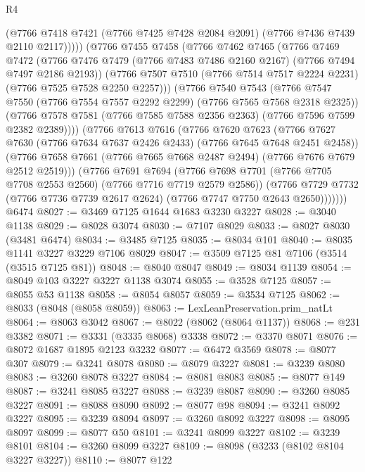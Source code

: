 \begin{lexlean}{R4}
\begin{coremodule}
              (@7766 @7418 @7421 (@7766 @7425 @7428 @2084 @2091) (@7766 @7436 @7439 @2110 @2117)))))
        (@7766
          @7455
          @7458
          (@7766
            @7462
            @7465
            (@7766
              @7469
              @7472
              (@7766 @7476 @7479 (@7766 @7483 @7486 @2160 @2167) (@7766 @7494 @7497 @2186 @2193))
              (@7766 @7507 @7510 (@7766 @7514 @7517 @2224 @2231) (@7766 @7525 @7528 @2250 @2257)))
            (@7766
              @7540
              @7543
              (@7766 @7547 @7550 (@7766 @7554 @7557 @2292 @2299) (@7766 @7565 @7568 @2318 @2325))
              (@7766 @7578 @7581 (@7766 @7585 @7588 @2356 @2363) (@7766 @7596 @7599 @2382 @2389))))
          (@7766
            @7613
            @7616
            (@7766
              @7620
              @7623
              (@7766 @7627 @7630 (@7766 @7634 @7637 @2426 @2433) (@7766 @7645 @7648 @2451 @2458))
              (@7766 @7658 @7661 (@7766 @7665 @7668 @2487 @2494) (@7766 @7676 @7679 @2512 @2519)))
            (@7766
              @7691
              @7694
              (@7766 @7698 @7701 (@7766 @7705 @7708 @2553 @2560) (@7766 @7716 @7719 @2579 @2586))
              (@7766
                @7729
                @7732
                (@7766 @7736 @7739 @2617 @2624)
                (@7766 @7747 @7750 @2643 @2650)))))))
    @6474
@8027 := @3469 @7125 @1644 @1683 @3230 @3227
@8028 := @3040 @1138
@8029 := @8028 @3074
@8030 := @7107 @8029
@8033 := @8027 @8030 (@3481 @6474)
@8034 := @3485 @7125
@8035 := @8034 @101
@8040 := @8035 @1141 @3227 @3229 @7106 @8029
@8047 := @3509 @7125 @81 @7106 (@3514 (@3515 @7125 @81))
@8048 := @8040 @8047
@8049 := @8034 @1139
@8054 := @8049 @103 @3227 @3227 @1138 @3074
@8055 := @3528 @7125
@8057 := @8055 @53 @1138
@8058 := @8054 @8057
@8059 := @3534 @7125
@8062 := @8033 (@8048 (@8058 @8059))
@8063 := LexLeanPreservation.prim_natLt
@8064 := @8063 @3042
@8067 := @8022 (@8062 (@8064 @1137))
@8068 := @231 @3382
@8071 := @3331 (@3335 @8068) @3338
@8072 := @3370 @8071
@8076 := @8072 @1687 @1895 @2123 @3232
@8077 := @6472 @3569
@8078 := @8077 @307
@8079 := @3241 @8078
@8080 := @8079 @3227
@8081 := @3239 @8080
@8083 := @3260 @8078 @3227
@8084 := @8081 @8083
@8085 := @8077 @149
@8087 := @3241 @8085 @3227
@8088 := @3239 @8087
@8090 := @3260 @8085 @3227
@8091 := @8088 @8090
@8092 := @8077 @98
@8094 := @3241 @8092 @3227
@8095 := @3239 @8094
@8097 := @3260 @8092 @3227
@8098 := @8095 @8097
@8099 := @8077 @50
@8101 := @3241 @8099 @3227
@8102 := @3239 @8101
@8104 := @3260 @8099 @3227
@8109 := @8098 (@3233 (@8102 @8104 @3227 @3227))
@8110 := @8077 @122

\end{coremodule}
\end{lexlean}
